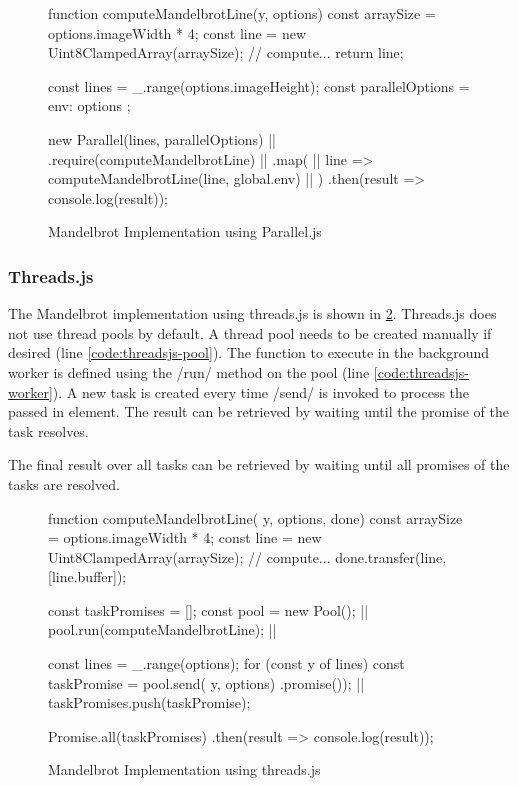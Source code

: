\begin{figure}
	\begin{javascriptcode}
function computeMandelbrotLine(y, options) {
	const arraySize = options.imageWidth * 4;
	const line = new Uint8ClampedArray(arraySize);
	// compute...
	return line;
}

const lines = _.range(options.imageHeight);
const parallelOptions = { env: options }; 

new Parallel(lines, parallelOptions) |$\label{code:paralleljs-definition}$|
	.require(computeMandelbrotLine)  |$\label{code:paralleljs-require}$|
	.map( |$\label{code:paralleljs-map}$|
		line => computeMandelbrotLine(line, global.env) |$\label{code:paralleljs-global}$|
	)
	.then(result => console.log(result));
\end{javascriptcode}

\caption{Mandelbrot Implementation using Parallel.js}
\label{fig:mandelbrot-paralleljs}
\end{figure}

\subsubsection{Threads.js}
 The Mandelbrot implementation using threads.js is shown in \cref{fig:mandelbrot-threadsjs}. Threads.js does not use thread pools by default. A thread pool needs to be created manually if desired (line \ref{code:threadsjs-pool}). The function to execute in the background worker is defined using the \javascriptinline/run/ method on the pool (line \ref{code:threadsjs-worker}). A new task is created every time \javascriptinline/send/ is invoked to process the passed in element. The result can be retrieved by waiting until the promise of the task resolves. 
 
The final result over all tasks can be retrieved by waiting until all promises of the tasks are resolved.


\begin{figure}
	\begin{javascriptcode}
function computeMandelbrotLine({ y, options}, done) {
	const arraySize = options.imageWidth * 4;
    const line = new Uint8ClampedArray(arraySize);
    // compute...
    done.transfer(line, [line.buffer]);
}

const taskPromises = [];
const pool = new Pool(); |$\label{code:threadsjs-pool}$|
pool.run(computeMandelbrotLine); |$\label{code:threadsjs-worker}$|

const lines = _.range(options);
for (const y of lines) {
	const taskPromise = pool.send({ y, options})
	                        .promise()); |$\label{code:threadsjs-messaging}$|
	taskPromises.push(taskPromise);
}

Promise.all(taskPromises)
	.then(result => console.log(result));	
\end{javascriptcode}
\caption{Mandelbrot Implementation using threads.js}
\label{fig:mandelbrot-threadsjs}
\end{figure}

